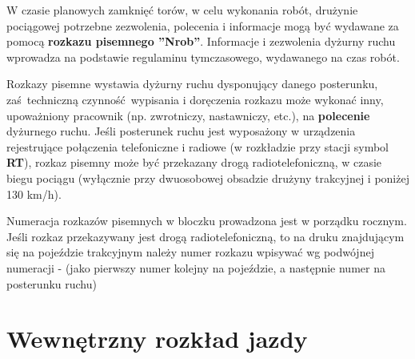 W czasie planowych zamknięć torów, w celu wykonania robót, drużynie pociągowej potrzebne zezwolenia, polecenia i informacje mogą być wydawane za pomocą \textbf{rozkazu pisemnego ''Nrob''}. Informacje i zezwolenia dyżurny ruchu wprowadza na podstawie regulaminu tymczasowego, wydawanego na czas robót.

Rozkazy pisemne wystawia dyżurny ruchu dysponujący danego posterunku, zaś techniczną czynność wypisania i doręczenia rozkazu może wykonać inny, upoważniony pracownik (np. zwrotniczy, nastawniczy, etc.), na \textbf{polecenie} dyżurnego ruchu. Jeśli posterunek ruchu jest wyposażony w urządzenia rejestrujące połączenia telefoniczne i radiowe (w rozkładzie przy stacji symbol \textbf{RT}), rozkaz pisemny może być przekazany drogą radiotelefoniczną, w czasie biegu pociągu (wyłącznie przy dwuosobowej obsadzie drużyny trakcyjnej i poniżej 130 km/h).

Numeracja rozkazów pisemnych w bloczku prowadzona jest w porządku rocznym. Jeśli rozkaz przekazywany jest drogą radiotelefoniczną, to na druku znajdującym się na pojeździe trakcyjnym należy numer rozkazu wpisywać wg podwójnej numeracji - (jako pierwszy numer kolejny na pojeździe, a następnie numer na posterunku ruchu)

\chapter{Wewnętrzny rozkład jazdy}

